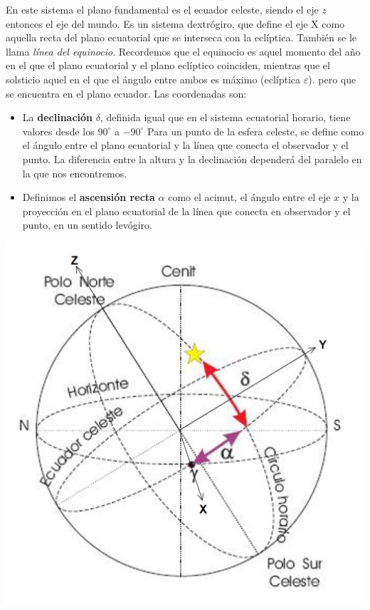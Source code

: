 En este sistema el plano fundamental es el ecuador celeste, siendo el eje $z$ entonces el eje del mundo. Es un sistema dextrógiro, que define el eje X como aquella recta del plano ecuatorial que se interseca con la eclíptica. También se le llama \textit{línea del equinocio}. Recordemos que el equinocio es aquel momento del año en el que el plano ecuatorial y el plano eclíptico coinciden, mientras que el solsticio aquel en el que el ángulo entre ambos es máximo (eclíptica $\varepsilon$). pero que se encuentra en el plano ecuador. Las coordenadas son:

\hspace{-8.0mm} \vspace{1.0mm} \begin{minipage}{0.6\textwidth}
\begin{itemize}
	\item La \textbf{declinación} $\delta$, definida igual que en el sistema ecuatorial horario, tiene valores desde los $90^\circ$ a $-90^\circ$ Para un punto de la esfera celeste, se define como el ángulo entre el plano ecuatorial y la línea que conecta el observador y el punto. La diferencia entre la altura y la declinación dependerá del paralelo en la que nos encontremos. 
	\item Definimos el \textbf{ascensión recta} $\alpha$ como el acimut, el ángulo entre el eje $x$ y la proyección en el plano ecuatorial de la línea que conecta en observador y el punto, en un sentido levógiro. 
\end{itemize}
\end{minipage}	\hfill
\begin{minipage}{0.35\textwidth} \centering
\includegraphics[width=1\textwidth]{Cuerpo/Imagenes/01_Ecuatoriales_Absolutas.png}	
\end{minipage}	




